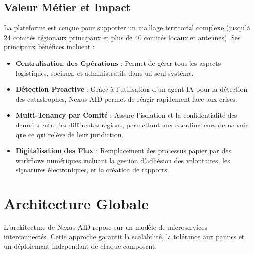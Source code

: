 \documentclass[12pt,a4paper]{report}
\begin{document}
\section{Valeur Métier et Impact}
La plateforme est conçue pour supporter un maillage territorial complexe (jusqu'à 24 comités régionaux principaux et plus de 40 comités locaux et antennes).
Ses principaux bénéfices incluent :
\begin{itemize}
    \item \textbf{Centralisation des Opérations} : Permet de gérer tous les aspects logistiques, sociaux, et administratifs dans un seul système.
    \item \textbf{Détection Proactive} : Grâce à l'utilisation d'un agent IA pour la détection des catastrophes, Nexus-AID permet de réagir rapidement face aux crises.
    \item \textbf{Multi-Tenancy par Comité} : Assure l'isolation et la confidentialité des données entre les différentes régions, permettant aux coordinateurs de ne voir que ce qui relève de leur juridiction.
    \item \textbf{Digitalisation des Flux} : Remplacement des processus papier par des workflows numériques incluant la gestion d'adhésion des volontaires, les signatures électroniques, et la création de rapports.
\end{itemize}

\chapter{Architecture Globale}
L'architecture de Nexus-AID repose sur un modèle de microservices interconnectés. Cette approche garantit la scalabilité, la tolérance aux pannes et un déploiement indépendant de chaque composant.
\end{document}
